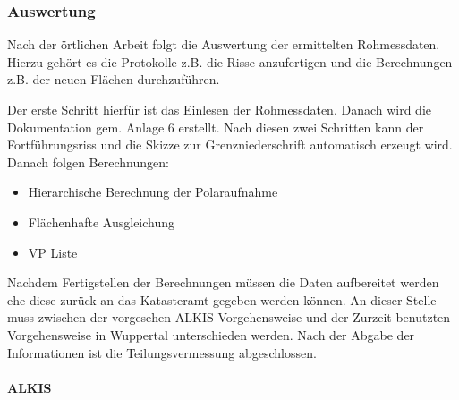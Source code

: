 
\subsubsection{Auswertung} \label{subsubsec:auswertung}

Nach der örtlichen Arbeit folgt die Auswertung der ermittelten Rohmessdaten. Hierzu gehört es die Protokolle z.B. die Risse anzufertigen und die Berechnungen z.B. der neuen Flächen durchzuführen. 

Der erste Schritt hierfür ist das Einlesen der Rohmessdaten.  Danach wird die Dokumentation gem. Anlage 6 erstellt.  Nach diesen zwei Schritten kann der Fortführungsriss und die Skizze zur Grenzniederschrift automatisch erzeugt wird.  Danach folgen Berechnungen:
\begin{itemize}
	\item Hierarchische Berechnung der Polaraufnahme
	\item Flächenhafte Ausgleichung
	\item VP Liste
\end{itemize}

Nachdem Fertigstellen der Berechnungen müssen die Daten aufbereitet werden ehe diese zurück an das Katasteramt gegeben werden können. An dieser Stelle muss zwischen der vorgesehen ALKIS-Vorgehensweise und der Zurzeit benutzten Vorgehensweise in Wuppertal unterschieden werden. Nach der Abgabe der Informationen ist die Teilungsvermessung abgeschlossen. 

\paragraph{ALKIS}

